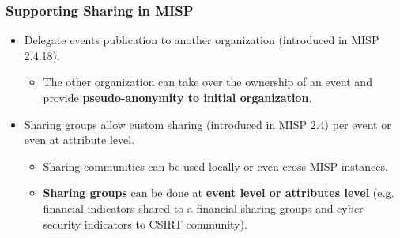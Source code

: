 \begin{frame}
\frametitle{Supporting Sharing in MISP}
\begin{itemize}
        \item Delegate events publication to another organization (introduced in MISP 2.4.18).
        \begin{itemize}
                \item The other organization can take over the ownership of an event and provide {\bf pseudo-anonymity to initial organization}.
        \end{itemize}
        \item Sharing groups allow custom sharing (introduced in MISP 2.4) per event or even at attribute level.
        \begin{itemize}
                \item Sharing communities can be used locally or even cross MISP instances.
                \item {\bf Sharing groups} can be done at {\bf event level or attributes level} (e.g. financial indicators shared to a financial sharing groups and cyber security indicators to CSIRT community).
        \end{itemize}
\end{itemize}
\end{frame}

